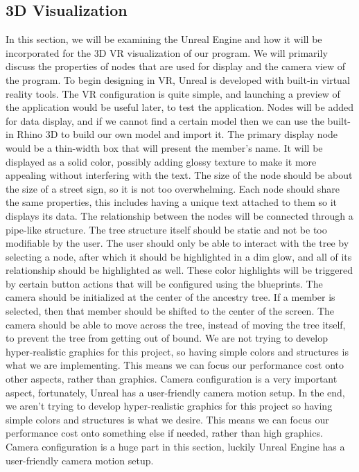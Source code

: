 \documentclass[onecolumn, draftclsnofoot, 10pt, compsoc]{IEEEtran}
\begin{document}
\subsection{3D Visualization}
\begin{singlespace}
In this section, we will be examining the Unreal Engine and how it will be incorporated for the 3D VR visualization of our program. We will primarily discuss the properties of nodes that are used for display and the camera view of the program.
\newline
\newline
To begin designing in VR, Unreal is developed with built-in virtual reality tools. The VR configuration is quite simple, and launching a preview of the application would be useful later, to test the application.
\newline
\newline
Nodes will be added for data display, and if we cannot find a certain model then we can use the built-in Rhino 3D to build our own model and import it. The primary display node would be a thin-width box that will present the member’s name. It will be displayed as a solid color, possibly adding glossy texture to make it more appealing without interfering with the text. The size of the node should be about the size of a street sign, so it is not too overwhelming. Each node should share the same properties, this includes having a unique text attached to them so it displays its data.
\newline
\newline
The relationship between the nodes will be connected through a pipe-like structure. The tree structure itself should be static and not be too modifiable by the user. The user should only be able to interact with the tree by selecting a node, after which it should be highlighted in a dim glow, and all of its relationship should be highlighted as well. These color highlights will be triggered by certain button actions that will be configured using the blueprints.
\newline
\newline
The camera should be initialized at the center of the ancestry tree. If a member is selected,  then that member should be shifted to the center of the screen. The camera should be able to move across the tree, instead of moving the tree itself, to prevent the tree from getting out of bound.
\newline
\newline
We are not trying to develop hyper-realistic graphics for this project, so having simple colors and structures is what we are implementing. This means we can focus our performance cost onto other aspects, rather than graphics. Camera configuration is a very important aspect, fortunately, Unreal has a user-friendly camera motion setup. 
\newline
\newline
In the end, we aren’t trying to develop hyper-realistic graphics for this project so having simple colors and structures is what we desire. This means we can focus our performance cost onto something else if needed, rather than high graphics. Camera configuration is a huge part in this section, luckily Unreal Engine has a user-friendly camera motion setup.


\end{singlespace}
\end{document}
